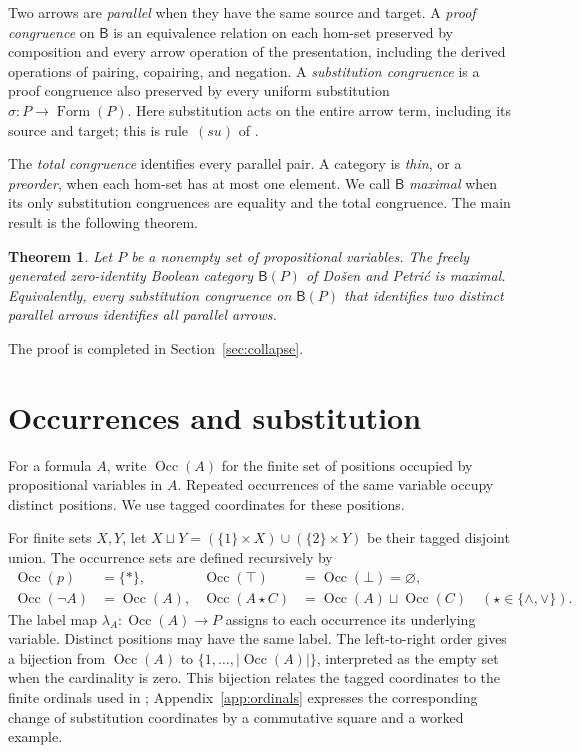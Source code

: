 \documentclass[11pt]{article}
\newtheorem{theorem}{Theorem}[section]
\newcommand{\B}{\mathsf B}
\newcommand{\Occ}{\operatorname{Occ}}
\newcommand{\FormulaSet}{\operatorname{Form}}
\begin{document}
Two arrows are \emph{parallel} when they have the same source and
target. A \emph{proof congruence} on $\B$ is an equivalence relation
on each hom-set preserved by composition and every arrow operation
of the presentation, including the derived operations of pairing,
copairing, and negation.
A \emph{substitution congruence} is a proof congruence also preserved
by every uniform substitution $\sigma:P\to\FormulaSet(P)$.
Here substitution acts on the entire arrow term, including its source
and target; this is rule~$(su)$ of \cite[\S2.7, p.~51]{DP}.

The \emph{total congruence} identifies every parallel pair. A category
is \emph{thin}, or a \emph{preorder}, when each hom-set has at most one
element. We call $\B$ \emph{maximal} when its only substitution
congruences are equality and the total congruence. The main result is
the following theorem.

\begin{theorem}\label{thm:main}
Let $P$ be a nonempty set of propositional variables. The freely
generated zero-identity Boolean category $\B(P)$ of Do\v{s}en and
Petri\'c is maximal. Equivalently, every substitution congruence on
$\B(P)$ that identifies two distinct parallel arrows identifies all
parallel arrows.
\end{theorem}

The proof is completed in Section~\ref{sec:collapse}.

\section{Occurrences and substitution}\label{sec:occurrences}

For a formula $A$, write $\Occ(A)$ for the finite set of positions
occupied by propositional variables in $A$. Repeated occurrences of the
same variable occupy distinct positions. We use tagged coordinates for
these positions.

For finite sets $X,Y$, let
$X\sqcup Y=(\{1\}\times X)\cup(\{2\}\times Y)$ be their tagged
disjoint union. The occurrence sets are defined recursively by
\[
 \begin{aligned}
 \Occ(p)&=\{*\},&
 \Occ(\top)&=\Occ(\bot)=\varnothing,\\
 \Occ(\neg A)&=\Occ(A),&
 \Occ(A\mathbin\star C)&=\Occ(A)\sqcup\Occ(C)
       \quad(\star\in\{\wedge,\vee\}).
 \end{aligned}
\]
The label map $\lambda_A:\Occ(A)\to P$ assigns to each occurrence
its underlying variable. Distinct positions may have the same label.
The left-to-right
order gives a bijection from $\Occ(A)$ to
$\{1,\ldots,|\Occ(A)|\}$, interpreted as the empty set when the
cardinality is zero. This bijection relates the tagged coordinates to
the finite ordinals used in \cite{DP}; Appendix~\ref{app:ordinals}
expresses the corresponding change of substitution coordinates by a
commutative square and a worked example.
\end{document}
